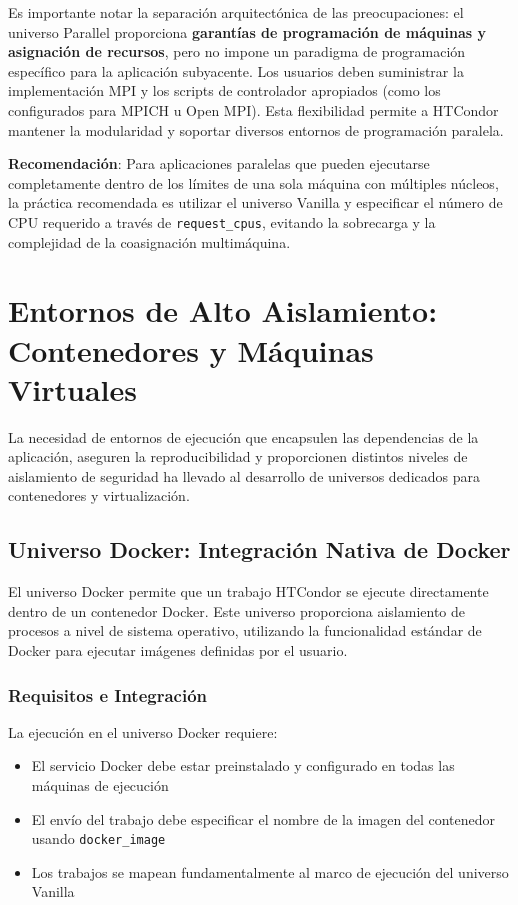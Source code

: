 Es importante notar la separación arquitectónica de las preocupaciones: el universo Parallel proporciona \textbf{garantías de programación de máquinas y asignación de recursos}, pero no impone un paradigma de programación específico para la aplicación subyacente. Los usuarios deben suministrar la implementación MPI y los scripts de controlador apropiados (como los configurados para MPICH u Open MPI). Esta flexibilidad permite a HTCondor mantener la modularidad y soportar diversos entornos de programación paralela.

\textbf{Recomendación}: Para aplicaciones paralelas que pueden ejecutarse completamente dentro de los límites de una sola máquina con múltiples núcleos, la práctica recomendada es utilizar el universo Vanilla y especificar el número de CPU requerido a través de \texttt{request\_cpus}, evitando la sobrecarga y la complejidad de la coasignación multimáquina.

\section{Entornos de Alto Aislamiento: Contenedores y Máquinas Virtuales}

La necesidad de entornos de ejecución que encapsulen las dependencias de la aplicación, aseguren la reproducibilidad y proporcionen distintos niveles de aislamiento de seguridad ha llevado al desarrollo de universos dedicados para contenedores y virtualización.

\subsection{Universo Docker: Integración Nativa de Docker}

El universo Docker permite que un trabajo HTCondor se ejecute directamente dentro de un contenedor Docker. Este universo proporciona aislamiento de procesos a nivel de sistema operativo, utilizando la funcionalidad estándar de Docker para ejecutar imágenes definidas por el usuario.

\subsubsection{Requisitos e Integración}

La ejecución en el universo Docker requiere:

\begin{itemize}
	\item El servicio Docker debe estar preinstalado y configurado en todas las máquinas de ejecución
	\item El envío del trabajo debe especificar el nombre de la imagen del contenedor usando \texttt{docker\_image}
	\item Los trabajos se mapean fundamentalmente al marco de ejecución del universo Vanilla
\end{itemize}

